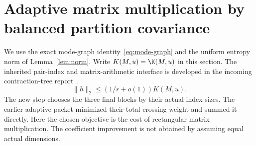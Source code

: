 \section{Adaptive matrix multiplication by balanced partition covariance}
\label{sec:adaptive-mm}

We use the exact mode-graph identity~\eqref{eq:mode-graph} and the
uniform entropy norm of Lemma~\ref{lem:norm}. Write $K(M,u)=\K(M,u)$
in this section. The inherited pair-index and matrix-arithmetic interface
is developed in the incoming contraction-tree report~\cite{incomingtree}.
\begin{equation}\label{eq:adaptive-norm}
 \|h\|_2\le(1/r+o(1))K(M,u).
\end{equation}
The new step chooses the three final blocks by their actual index sizes.
The earlier adaptive packet minimized their total crossing weight and
summed it directly.  Here the chosen objective is the cost of rectangular
matrix multiplication.  The coefficient improvement is not obtained by
assuming equal actual dimensions.

